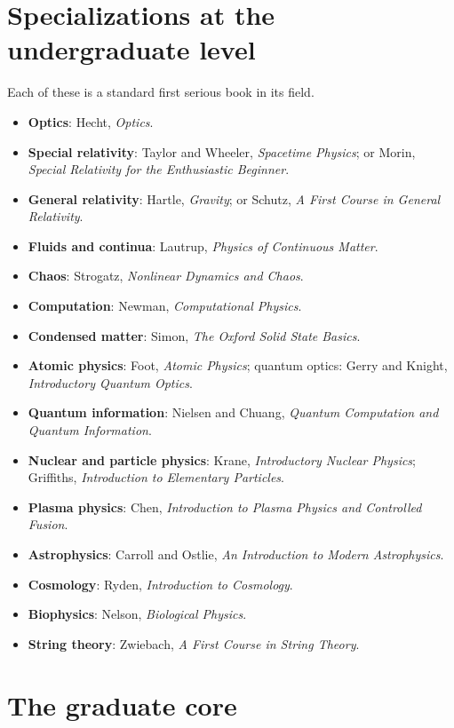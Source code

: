 \section*{Specializations at the undergraduate level}

Each of these is a standard first serious book in its field.
\begin{itemize}[itemsep=3pt]
  \item \textbf{Optics}: Hecht, \emph{Optics}.
  \item \textbf{Special relativity}: Taylor and Wheeler, \emph{Spacetime Physics}; or Morin, \emph{Special Relativity for the Enthusiastic Beginner}.
  \item \textbf{General relativity}: Hartle, \emph{Gravity}; or Schutz, \emph{A First Course in General Relativity}.
  \item \textbf{Fluids and continua}: Lautrup, \emph{Physics of Continuous Matter}.
  \item \textbf{Chaos}: Strogatz, \emph{Nonlinear Dynamics and Chaos}.
  \item \textbf{Computation}: Newman, \emph{Computational Physics}.
  \item \textbf{Condensed matter}: Simon, \emph{The Oxford Solid State Basics}.
  \item \textbf{Atomic physics}: Foot, \emph{Atomic Physics}; quantum optics: Gerry and Knight, \emph{Introductory Quantum Optics}.
  \item \textbf{Quantum information}: Nielsen and Chuang, \emph{Quantum Computation and Quantum Information}.
  \item \textbf{Nuclear and particle physics}: Krane, \emph{Introductory Nuclear Physics}; Griffiths, \emph{Introduction to Elementary Particles}.
  \item \textbf{Plasma physics}: Chen, \emph{Introduction to Plasma Physics and Controlled Fusion}.
  \item \textbf{Astrophysics}: Carroll and Ostlie, \emph{An Introduction to Modern Astrophysics}.
  \item \textbf{Cosmology}: Ryden, \emph{Introduction to Cosmology}.
  \item \textbf{Biophysics}: Nelson, \emph{Biological Physics}.
  \item \textbf{String theory}: Zwiebach, \emph{A First Course in String Theory}.
\end{itemize}

\section*{The graduate core}

